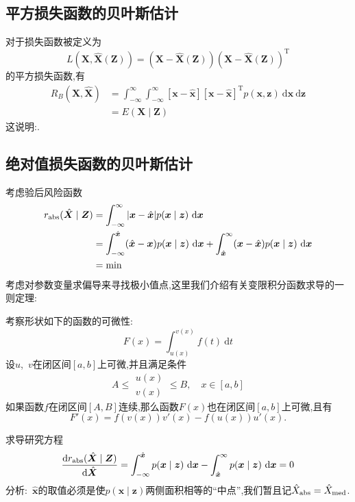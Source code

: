 \documentclass[cn,10pt,citestyle=gb7714-2015,bibstyle=gb7714-2015]{elegantbook}
\newcommand{\md}{\ \mathrm{d}}
\newcommand{\mT}{\mathrm{T}}
\begin{document}
\subsection{平方损失函数的贝叶斯估计}
对于损失函数被定义为
\begin{equation}
  L(\bm{X},\hat{\bm{X}}(\bm{Z}))=(\bm{X}-\hat{\bm{X}}(\bm{Z}))(\bm{X}-\hat{\bm{X}}(\bm{Z}))^\mT
\end{equation}
的平方损失函数,有
\begin{align*}
  R_B(\bm{X},\hat{\bm{X}})&=\int_{-\infty}^\infty\!\int_{-\infty}^\infty[\bm{x}-\hat{\bm{x}}][\bm{x}-\hat{\bm{x}}]^\mT p(\bm{x},\bm{z})\md\bm{x}\!\md\bm{z}\\
  &=E(\bm{X}\mid\bm{Z})
\end{align*}
这说明:.
\subsection{绝对值损失函数的贝叶斯估计}
考虑验后风险函数
\begin{align*}
  r_{\textup{abs}}(\hat{\bm{X}}\mid\bm{Z})&=\int_{-\infty}^\infty|\bm{x}-\hat{\bm{x}}|p(\bm{x}\mid\bm{z})\md\bm{x}\\
  &=\int_{-\infty}^{\hat{\bm{x}}}(\hat{\bm{x}}-\bm{x})p(\bm{x}\mid\bm{z})\md\bm{x}+\int_{\hat{\bm{x}}}^\infty (\bm{x}-\hat{\bm{x}})p(\bm{x}\mid\bm{z})\md\bm{x}\\
  &=\min
\end{align*}
考虑对参数变量求偏导来寻找极小值点,这里我们介绍有关变限积分函数求导的一则定理:
\begin{theorem}[变限积分函数的导数]\label{thm:uncertained-limited-integral}
  考察形状如下的函数的可微性:
  \[
    F(x)=\int_{u(x)}^{v(x)}f(t)\md t  
  \]
  设$u$,\ $v$在闭区间$[a,b]$上可微,并且满足条件
  \[
      A\leqslant \begin{matrix}
        u(x)\\
        v(x)
      \end{matrix}\leqslant B,\quad x\in[a,b]
  \]
  如果函数$f$在闭区间$[A,B]$连续,那么函数$F(x)$也在闭区间$[a,b]$上可微,且有
  \begin{equation}
    F'(x)=f(v(x))v'(x)-f(u(x))u'(x).
  \end{equation}
\end{theorem}
求导研究方程
\[
    \frac{\mathrm{d}r_{\textup{abs}}(\hat{\bm{X}}\mid\bm{Z})}{\mathrm{d}\hat{\bm{X}}}=\int_{-\infty}^{\hat{\bm{x}}}p(\bm{x}\mid\bm{z})\md\bm{x}-\int_{\hat{\bm{x}}}^\infty p(\bm{x}\mid\bm{z})\md\bm{x}=0
\]
分析:\ $\hat{\bm{x}}$的取值必须是使$p(\bm{x}\mid\bm{z})$两侧面积相等的“中点”,我们暂且记$\hat{X}_{\textup{abs}}=\hat{X}_{\textup{med}}$.
\end{document}
